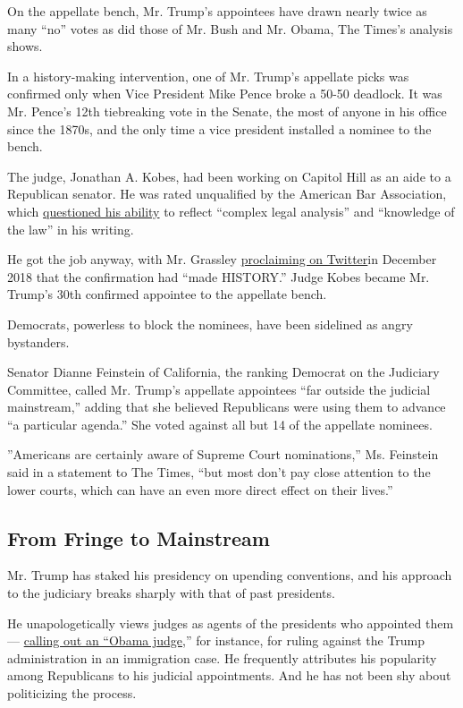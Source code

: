On the appellate bench, Mr. Trump's appointees have drawn nearly twice
as many ``no'' votes as did those of Mr. Bush and Mr. Obama, The Times's
analysis shows.

In a history-making intervention, one of Mr. Trump's appellate picks was
confirmed only when Vice President Mike Pence broke a 50-50 deadlock. It
was Mr. Pence's 12th tiebreaking vote in the Senate, the most of anyone
in his office since the 1870s, and the only time a vice president
installed a nominee to the bench.

The judge, Jonathan A. Kobes, had been working on Capitol Hill as an
aide to a Republican senator. He was rated unqualified by the American
Bar Association, which
\href{https://www.americanbar.org/content/dam/aba/uncategorized/GAO/2018-9-14ChairtoGrassleyFeinstein-statementon-JonathanKobesnominee-EighthCCA.pdf}{questioned
his ability} to reflect ``complex legal analysis'' and ``knowledge of
the law'' in his writing.

He got the job anyway, with Mr. Grassley
\href{https://twitter.com/chuckgrassley/status/1072638424664952835?lang=en}{proclaiming
on Twitter}in December 2018 that the confirmation had ``made HISTORY.''
Judge Kobes became Mr. Trump's 30th confirmed appointee to the appellate
bench.

Democrats, powerless to block the nominees, have been sidelined as angry
bystanders.

Senator Dianne Feinstein of California, the ranking Democrat on the
Judiciary Committee, called Mr. Trump's appellate appointees ``far
outside the judicial mainstream,'' adding that she believed Republicans
were using them to advance ``a particular agenda.'' She voted against
all but 14 of the appellate nominees.

''Americans are certainly aware of Supreme Court nominations,'' Ms.
Feinstein said in a statement to The Times, ``but most don't pay close
attention to the lower courts, which can have an even more direct effect
on their lives.''

\hypertarget{from-fringe-to-mainstream}{%
\subsection{From Fringe to Mainstream}\label{from-fringe-to-mainstream}}

Mr. Trump has staked his presidency on upending conventions, and his
approach to the judiciary breaks sharply with that of past presidents.

He unapologetically views judges as agents of the presidents who
appointed them ---
\href{https://www.nytimes.com/2018/11/20/us/politics/trump-appeals-court-ninth-circuit.html}{calling
out an ``Obama judge},'' for instance, for ruling against the Trump
administration in an immigration case. He frequently attributes his
popularity among Republicans to his judicial appointments. And he has
not been shy about politicizing the process.

